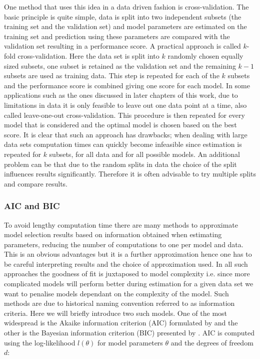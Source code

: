 One method that uses this idea in a data driven fashion is cross-validation. The basic principle is quite simple, data  is split into two independent subsets (the training set and the validation set) and model parameters are estimated on the training set and prediction using these parameters are compared with the validation set resulting in a performance score. A practical approach is called $k$-fold cross-validation. Here the data set is split into $k$ randomly chosen equally sized subsets, one subset is retained as the validation set and the remaining $k-1$ subsets are used as training data. This step is repeated for each of the $k$ subsets and the performance score is combined giving one score for each model. In some applications such as the ones discussed in later chapters of this work, due to limitations in data it is only feasible to leave out one data point at a time, also called leave-one-out cross-validation. This procedure is then repeated for every model that is considered and the optimal model is chosen based on the best score. It is clear that such an approach has drawbacks; when dealing with large data sets computation times can quickly become infeasible since estimation is repeated for $k$ subsets, for all data and for all possible models. An additional problem can be that due to the random splits in data the choice of the split influences results significantly. Therefore it is often advisable to try multiple splits and compare results.

\subsubsection{AIC and BIC}
\label{sec:aic}

To avoid lengthy computation time there are many methods to approximate model selection results based on information obtained when estimating parameters, reducing the number of computations to one per model and data. This is an obvious advantages but it is a further approximation hence one has to be careful interpreting results and the choice of approximation used. In all such approaches the goodness of fit is juxtaposed to model complexity i.e. since more complicated models will perform better during estimation for a given data set we want to penalise models dependant on the complexity of the model. Such methods are due to historical naming convention referred to as information criteria. Here we will briefly introduce two such models. One of the most widespread is the Akaike information criterion (AIC) formulated by \cite{Akaike:1974ih} and the other is the Bayesian information criterion (BIC) presented by \cite{Schwarz:1978uv}. AIC is computed using the log-likelihood $l(\theta)$ for model parameters $\theta$ and the degrees of freedom $d$:


